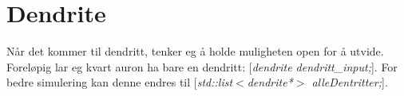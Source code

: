 \section{Dendrite}
Når det kommer til dendritt, tenker eg å holde muligheten open for å utvide. Foreløpig lar eg kvart auron ha bare en dendritt: [\emph{\small{dendrite dendritt\_input;}}].
For bedre simulering kan denne endres til [\emph{\small{std::list$<$dendrite*$>$ alleDentritter;}}].



